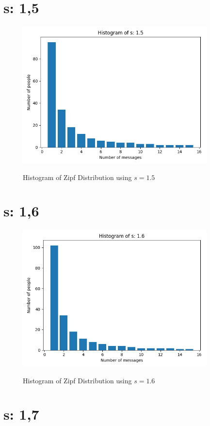 \documentclass{article}
\begin{document}
\section{s: 1,5}
\begin{figure}[H] \centering
 \includegraphics[width=10cm]{imgs/histogram-15.png}
 \label{fig:hist-15}
 \caption{Histogram of Zipf Distribution using $s=1.5$} \end{figure}




\section{s: 1,6}

\begin{figure}[H] \centering
 \includegraphics[width=10cm]{imgs/histogram-16.png}
 \label{fig:hist-16}
 \caption{Histogram of Zipf Distribution using $s=1.6$} \end{figure}




\section{s: 1,7}
\end{document}
